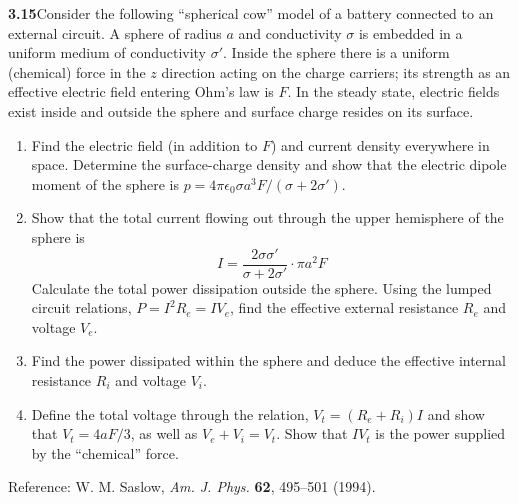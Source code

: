 \par\bigskip
\noindent\textbf{3.15}\quad Consider the following ``spherical cow'' model of a battery connected to an external circuit. A sphere of radius $a$ and conductivity $\sigma$ is embedded in a uniform medium of conductivity $\sigma'$. Inside the sphere there is a uniform (chemical) force in the $z$ direction acting on the charge carriers; its strength as an effective electric field entering Ohm's law is $F$. In the steady state, electric fields exist inside and outside the sphere and surface charge resides on its surface.
\begin{enumerate}
\item[(a)] Find the electric field (in addition to $F$) and current density everywhere in space. Determine the surface-charge density and show that the electric dipole moment of the sphere is $p=4\pi\epsilon_{0}\sigma a^{3}F/(\sigma+2\sigma')$.
\item[(b)] Show that the total current flowing out through the upper hemisphere of the sphere is
\[
I=\frac{2\sigma\sigma'}{\sigma+2\sigma'}\cdot\pi a^{2}F
\]
Calculate the total power dissipation outside the sphere. Using the lumped circuit relations, $P=I^{2}R_{e}=IV_{e}$, find the effective external resistance $R_{e}$ and voltage $V_{e}$.
\item[(c)] Find the power dissipated within the sphere and deduce the effective internal resistance $R_{i}$ and voltage $V_{i}$.
\item[(d)] Define the total voltage through the relation, $V_{t}=(R_{e}+R_{i})I$ and show that $V_{t}=4aF/3$, as well as $V_{e}+V_{i}=V_{t}$. Show that $IV_{t}$ is the power supplied by the ``chemical'' force.
\end{enumerate}
Reference: W. M. Saslow, \emph{Am. J. Phys.} \textbf{62}, 495--501 (1994).
\solution

